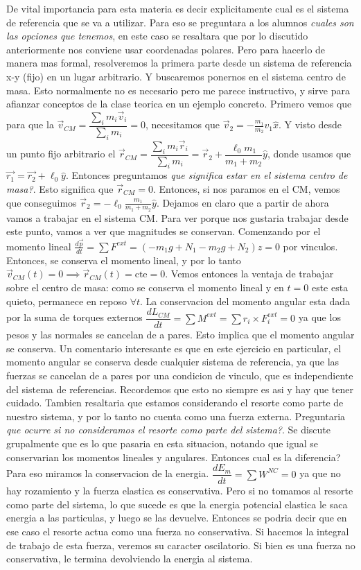 \documentclass[12pt,a4paper]{article}
\begin{document}
De vital importancia para esta materia es decir explicitamente cual es el sistema de referencia que se va a utilizar. Para eso se preguntara a los alumnos \textit{cuales son las opciones que tenemos}, en este caso se resaltara que por lo discutido anteriormente nos conviene usar coordenadas polares. Pero para hacerlo de manera mas formal, resolveremos la primera parte desde un sistema de referencia x-y (fijo) en un lugar arbitrario. Y buscaremos ponernos en el sistema centro de masa. Esto normalmente no es necesario pero me parece instructivo, y sirve para afianzar conceptos de la clase teorica en un ejemplo concreto. Primero vemos que para que la $\vec{v}_{CM}=\dfrac{\sum_i m_i\vec{v}_i}{\sum_i m_i}=0$, necesitamos que $\vec{v}_2=-\frac{m_1}{m_2}v_1\hat{x}$. Y visto desde un punto fijo arbitrario el $\vec{r}_{CM}=\dfrac{\sum_i m_i\vec{r}_i}{\sum_i m_i}=\vec{r}_2+\dfrac{\ell_0m_1}{m_1+m_2}\hat{y}$, donde usamos que $\vec{r_1}=\vec{r_2}+\ell_0\hat{y}$. Entonces preguntamos \textit{que significa estar en el sistema centro de masa?}. Esto significa que $\vec{r}_{CM}=0$. Entonces, si nos paramos en el CM, vemos que conseguimos $\vec{r}_2=-\ell_0\frac{m_1}{m_1+m_2}\hat{y}$. Dejamos en claro que a partir de ahora vamos a trabajar en el sistema CM. Para ver porque nos gustaria trabajar desde este punto, vamos a ver que magnitudes se conservan. Comenzando por el momento lineal $\frac{d\vec{p}}{dt}=\sum F^{ext}= (-m_1g+N_1-m_2g+N_2)\hat{z}=0$ por vinculos. Entonces, se conserva el momento lineal, y por lo tanto $\vec{v}_{CM}(t)=0 \implies \vec{r}_{CM}(t)=\text{cte}=0$. Vemos entonces la ventaja de trabajar sobre el centro de masa: como se conserva el momento lineal y en $t=0$ este esta quieto, permanece en reposo $\forall t$. La conservacion del momento angular esta dada por la suma de torques externos $\dfrac{d L_{CM}}{dt}=\sum M^{ext}=\sum r_i\times F_i^{ext}=0$ ya que los pesos y las normales se cancelan de a pares. Esto implica que el momento angular se conserva. Un comentario interesante es que en este ejercicio en particular, el momento angular se conserva desde cualquier sistema de referencia, ya que las fuerzas se cancelan de a pares por una condicion de vinculo, que es independiente del sistema de referencias. Recordemos que esto no siempre es asi y hay que tener cuidado. Tambien resaltaria que estamos considerando el resorte como parte de nuestro sistema, y por lo tanto no cuenta como una fuerza externa. Preguntaria \textit{que ocurre si no consideramos el resorte como parte del sistema?}. Se discute grupalmente que es lo que pasaria en esta situacion, notando que igual se conservarian los momentos lineales y angulares. Entonces cual es la diferencia? Para eso miramos la conservacion de la energia. $\dfrac{dE_m}{dt}=\sum W^{NC}=0$ ya que no hay rozamiento y la fuerza elastica es conservativa. Pero si no tomamos al resorte como parte del sistema, lo que sucede es que la energia potencial elastica le saca energia a las particulas, y luego se las devuelve. Entonces se podria decir que en ese caso el resorte actua como una fuerza no conservativa. Si hacemos la integral de trabajo de esta fuerza, veremos su caracter oscilatorio. Si bien es una fuerza no conservativa, le termina devolviendo la energia al sistema. 
\end{document}
